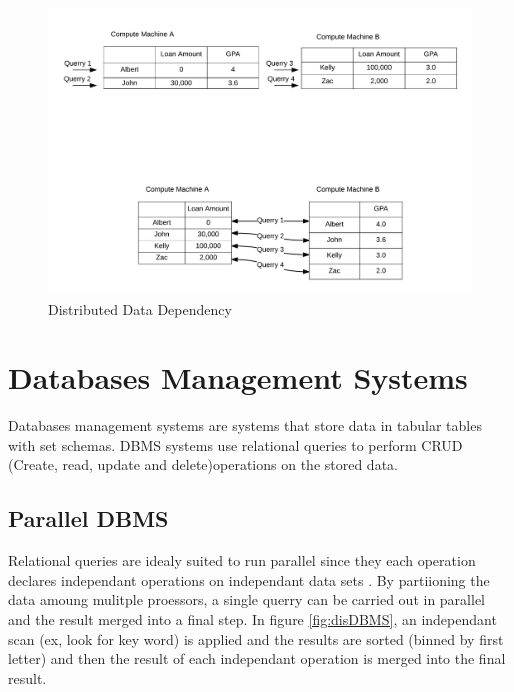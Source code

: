 \documentclass[10pt,twocolumn]{IEEEtran11}
\begin{document}
\begin{figure}[h]
\centering
\includegraphics[scale=0.12]{images/parallelComputation.png}
\caption{Distributed Data Dependency}
\label{fig:distDataDependency}
\end{figure}


\section{Databases Management Systems}

Databases management systems are systems that store data in tabular tables with set schemas.  DBMS systems use relational queries to perform CRUD 
(Create, read, update and delete)operations on the stored data.  


\subsection{Parallel DBMS}

Relational queries are idealy suited to run parallel since they
each operation declares independant operations on independant data sets \cite{dewitt1992parallel}.  By partiioning the data amoung mulitple proessors, a single querry can be carried out in parallel and the result merged into a final step.  In figure \ref{fig:disDBMS}, an independant scan (ex, look for key word) is applied and the results are sorted (binned by first letter) and then the result of each independant operation is merged into the final result.
\end{document}
